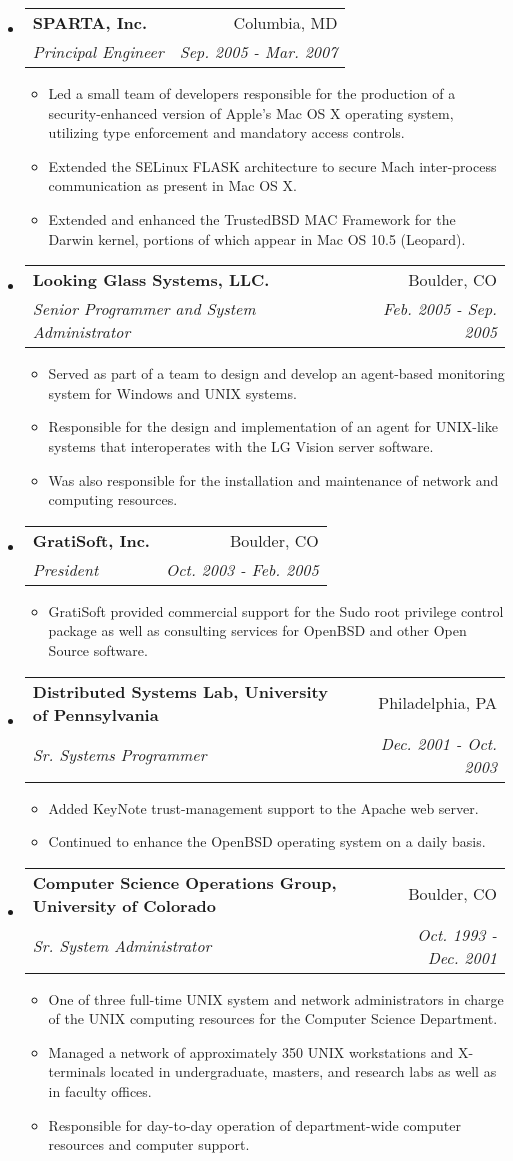 \documentclass[a4paper,11pt]{article}
\makeatletter
\newcommand{\resitem}[1]{\item #1 \vspace{-2pt}}
\newcommand{\ressubheading}[4]{
\begin{tabular*}{172mm}{l@{\extracolsep{\fill}}r}
		\textbf{#1} & #2 \\
		\textit{#3} & \textit{#4} \\
\end{tabular*}\vspace{-6pt}}
\makeatother
\begin{document}
\begin{itemize}
\item
	\ressubheading{SPARTA, Inc.}{Columbia, MD}{Principal Engineer}{Sep. 2005 - Mar. 2007}
	\begin{itemize}
		\resitem{Led a small team of developers responsible for the production of a security-enhanced version of Apple's Mac OS X operating system, utilizing type enforcement and mandatory access controls.}
		\resitem{Extended the SELinux FLASK architecture to secure Mach inter-process communication as present in Mac OS X.}
		\resitem{Extended and enhanced the TrustedBSD MAC Framework for the Darwin kernel, portions of which appear in Mac OS 10.5 (Leopard).}
	\end{itemize}

\item
	\ressubheading{Looking Glass Systems, LLC.}{Boulder, CO}{Senior Programmer and System Administrator}{Feb. 2005 - Sep. 2005}
	\begin{itemize}
		\resitem{Served as part of a team to design and develop an agent-based monitoring system for Windows and {\sc UNIX} systems.}
		\resitem{Responsible for the design and implementation of an agent for UNIX-like systems that interoperates with the LG Vision server software.}
		\resitem{Was also responsible for the installation and maintenance of network and computing resources.}
	\end{itemize}

\item
	\ressubheading{GratiSoft, Inc.}{Boulder, CO}{President}{Oct. 2003 - Feb. 2005}
	\begin{itemize}
		\resitem{GratiSoft provided commercial support for the Sudo root privilege control package as well as consulting services for OpenBSD and other Open Source software.}
	\end{itemize}

\item
	\ressubheading{Distributed Systems Lab, University of Pennsylvania}{Philadelphia, PA}{Sr. Systems Programmer}{Dec. 2001 - Oct. 2003}
	\begin{itemize}
		\resitem{Added KeyNote trust-management support to the Apache web server.}
		\resitem{Continued to enhance the OpenBSD operating system on a daily basis.}
	\end{itemize}

\item
	\ressubheading{Computer Science Operations Group, University of Colorado}{Boulder, CO}{Sr. System Administrator}{Oct. 1993 - Dec. 2001}
	\begin{itemize}
		\resitem{One of three full-time {\sc UNIX} system and network administrators in charge of the {\sc UNIX} computing resources for the Computer Science Department.}
		\resitem{Managed a network of approximately 350 {\sc UNIX} workstations and X-terminals located in undergraduate, masters, and research labs as well as in faculty offices.}
		\resitem{Responsible for day-to-day operation of department-wide computer resources and computer support.}
	\end{itemize}


\end{itemize}
\end{document}
